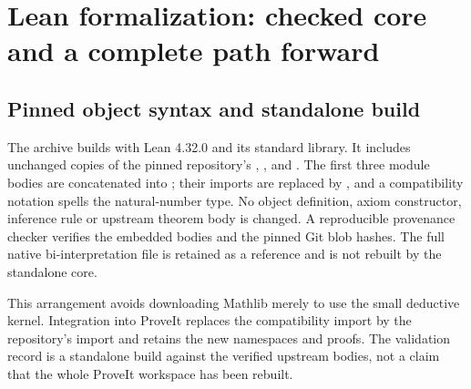 \section{Lean formalization: checked core and a complete path forward}
\label{sec:formalization}

\subsection{Pinned object syntax and standalone build}

The archive builds with Lean 4.32.0 and its standard library. It includes
unchanged copies of the pinned repository's ,
,  and
. The first three module bodies are
concatenated into ; their imports are replaced
by , and a compatibility notation spells the
natural-number type. No object definition, axiom constructor, inference
rule or upstream theorem body is changed. A reproducible provenance
checker verifies the embedded bodies and the pinned Git blob hashes.
The full native bi-interpretation file is retained as a reference and
is not rebuilt by the standalone core.

This arrangement avoids downloading Mathlib merely to use the small
deductive kernel. Integration into ProveIt replaces the compatibility
import by the repository's  import and retains
the new namespaces and proofs. The validation record is a standalone
build against the verified upstream bodies, not a claim that the whole
ProveIt workspace has been rebuilt.

